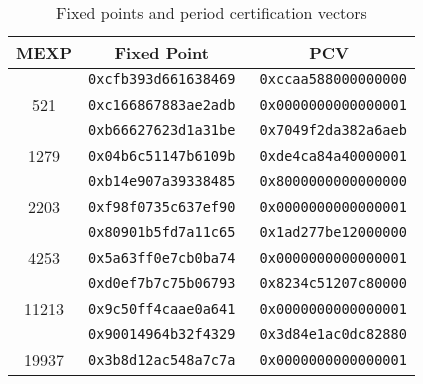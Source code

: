 \documentclass{svmult}
\begin{document}
\begin{table}
  \begin{center}
    \caption{Fixed points and period certification vectors}
    \label{tab:pcv}
    \begin{tabular}{c|rr} \hline
      MEXP & \multicolumn{1}{c}{Fixed Point} 
      & \multicolumn{1}{c}{PCV} \\ \hline \hline
      & \texttt{0xcfb393d661638469} & \texttt{0xccaa588000000000} \\
      521 & \texttt{0xc166867883ae2adb} &\texttt{ 0x0000000000000001} \\ \hline
      & \texttt{0xb66627623d1a31be} & \texttt{0x7049f2da382a6aeb} \\
      1279 & \texttt{0x04b6c51147b6109b} & \texttt{0xde4ca84a40000001} \\ \hline
      & \texttt{0xb14e907a39338485} & \texttt{0x8000000000000000} \\
      2203 & \texttt{0xf98f0735c637ef90} & \texttt{0x0000000000000001} \\ \hline
      & \texttt{0x80901b5fd7a11c65} & \texttt{0x1ad277be12000000} \\
      4253 & \texttt{0x5a63ff0e7cb0ba74} & \texttt{0x0000000000000001} \\ \hline
      & \texttt{0xd0ef7b7c75b06793} & \texttt{0x8234c51207c80000} \\
      11213 & \texttt{0x9c50ff4caae0a641} & \texttt{0x0000000000000001}\\ \hline
      & \texttt{0x90014964b32f4329} & \texttt{0x3d84e1ac0dc82880} \\
      19937 & \texttt{0x3b8d12ac548a7c7a} & \texttt{0x0000000000000001} \\ 
      \hline
    \end{tabular}
  \end{center}
\end{table}


\end{document}
